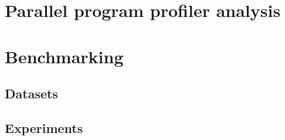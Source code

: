 \section{Parallel program profiler analysis}

\section{Benchmarking}
\subsection{Datasets}

\subsection{Experiments}
